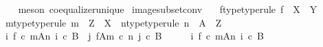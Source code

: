 \begin{isabellebody}
\ \ \ \ \isamarkupfalse%
\ {\isacharparenleft}{\kern0pt}meson\ coequalizer{\isacharunderscore}{\kern0pt}unique{\isacharparenright}{\kern0pt}\isanewline
{}\isamarkupfalse%
%
\endisatagproof
{\isafoldproof}%
%
\isadelimproof
\isanewline
%
\endisadelimproof
\isanewline
{}\isamarkupfalse%
\ image{\isacharunderscore}{\kern0pt}subset{\isacharunderscore}{\kern0pt}conv{\isacharcolon}{\kern0pt}\isanewline
\ \ \ f{\isacharunderscore}{\kern0pt}type{\isacharbrackleft}{\kern0pt}type{\isacharunderscore}{\kern0pt}rule{\isacharbrackright}{\kern0pt}{\isacharcolon}{\kern0pt}\ {\isachardoublequoteopen}f\ {\isacharcolon}{\kern0pt}\ X\ {\isasymrightarrow}\ Y{\isachardoublequoteclose}\isanewline
\ \ \ m{\isacharunderscore}{\kern0pt}type{\isacharbrackleft}{\kern0pt}type{\isacharunderscore}{\kern0pt}rule{\isacharbrackright}{\kern0pt}{\isacharcolon}{\kern0pt}\ {\isachardoublequoteopen}m\ {\isacharcolon}{\kern0pt}\ Z\ {\isasymrightarrow}\ X{\isachardoublequoteclose}\ \ n{\isacharunderscore}{\kern0pt}type{\isacharbrackleft}{\kern0pt}type{\isacharunderscore}{\kern0pt}rule{\isacharbrackright}{\kern0pt}{\isacharcolon}{\kern0pt}\ {\isachardoublequoteopen}n\ {\isacharcolon}{\kern0pt}\ A\ {\isasymrightarrow}\ Z{\isachardoublequoteclose}\ \isanewline
\ \ \ {\isachardoublequoteopen}{\isasymexists}i{\isachardot}{\kern0pt}\ {\isacharparenleft}{\kern0pt}{\isacharparenleft}{\kern0pt}f\ {\isasymcirc}\isactrlsub c\ m{\isacharparenright}{\kern0pt}{\isasymlparr}A{\isasymrparr}\isactrlbsub n\isactrlesub {\isacharcomma}{\kern0pt}\ i{\isacharparenright}{\kern0pt}\ {\isasymsubseteq}\isactrlsub c\ B\ {\isasymLongrightarrow}\ {\isasymexists}j{\isachardot}{\kern0pt}\ {\isacharparenleft}{\kern0pt}f{\isasymlparr}A{\isasymrparr}\isactrlbsub m\ {\isasymcirc}\isactrlsub c\ n\isactrlesub {\isacharcomma}{\kern0pt}\ j{\isacharparenright}{\kern0pt}\ {\isasymsubseteq}\isactrlsub c\ B{\isachardoublequoteclose}\isanewline
%
\isadelimproof
%
\endisadelimproof
%
\isatagproof
{}\isamarkupfalse%
\ {\isacharminus}{\kern0pt}\isanewline
\ \ \isamarkupfalse%
\ {\isachardoublequoteopen}{\isasymexists}i{\isachardot}{\kern0pt}\ {\isacharparenleft}{\kern0pt}{\isacharparenleft}{\kern0pt}f\ {\isasymcirc}\isactrlsub c\ m{\isacharparenright}{\kern0pt}{\isasymlparr}A{\isasymrparr}\isactrlbsub n\isactrlesub {\isacharcomma}{\kern0pt}\ i{\isacharparenright}{\kern0pt}\ {\isasymsubseteq}\isactrlsub c\ B{\isachardoublequoteclose}\isanewline
\ \ \isamarkupfalse%
\ \isamarkupfalse%

\end{isabellebody}
